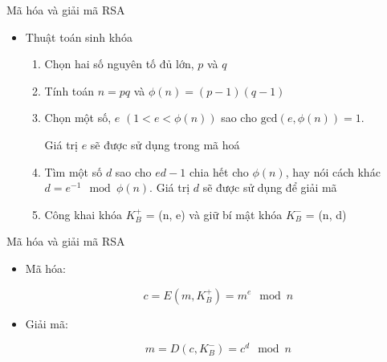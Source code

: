 \documentclass{beamer}
\begin{document}
\begin{frame}{Mã hóa và giải mã RSA}
\begin{itemize}
\item Thuật toán sinh khóa

\begin{enumerate}
\item Chọn hai số nguyên tố đủ lớn, $p$ và $q$
\item Tính toán $n = pq$ và $\phi(n) = (p - 1)(q - 1)$
\item Chọn một số, $e$ $(1 < e < \phi(n))$ sao cho $\text{gcd}(e, \phi(n)) = 1$.

Giá trị $e$ sẽ được sử dụng trong mã hoá
\item Tìm một số $d$ sao cho $ed - 1$ chia hết cho $\phi(n)$, hay nói cách khác $d = e^{-1} \mod \phi(n)$. Giá trị $d$ sẽ được sử dụng để giải mã
\item Công khai khóa $K^+_B$ = (n, e) và giữ bí mật khóa $K^-_B$ = (n, d)
\end{enumerate}
\end{itemize}
\end{frame}
\begin{frame}{Mã hóa và giải mã RSA}
\begin{itemize}
\item Mã hóa:

\[
c = E (m, K_B^+) = m^e \mod n
\]
\item Giải mã:

\[
m = D (c, K_B^-) = c^d \mod n
\]
\end{itemize}
\end{frame}
\end{document}
